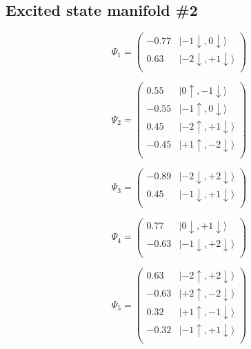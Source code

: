 \documentclass{article}
\begin{document}
\subsection{Excited state manifold \#2}


\begin{equation}
\Psi_{1} = 
\begin{pmatrix}
-      0.77  &  |-1\downarrow , 0\downarrow\rangle  \\
      0.63  &  |-2\downarrow , +1\downarrow\rangle  \\
\end{pmatrix}
\end{equation}

\begin{equation}
\Psi_{2} = 
\begin{pmatrix}
      0.55  &  |0\uparrow , -1\downarrow\rangle  \\
-      0.55  &  |-1\uparrow , 0\downarrow\rangle  \\
      0.45  &  |-2\uparrow , +1\downarrow\rangle  \\
-      0.45  &  |+1\uparrow , -2\downarrow\rangle  \\
\end{pmatrix}
\end{equation}

\begin{equation}
\Psi_{3} = 
\begin{pmatrix}
-      0.89  &  |-2\downarrow , +2\downarrow\rangle  \\
      0.45  &  |-1\downarrow , +1\downarrow\rangle  \\
\end{pmatrix}
\end{equation}

\begin{equation}
\Psi_{4} = 
\begin{pmatrix}
      0.77  &  |0\downarrow , +1\downarrow\rangle  \\
-      0.63  &  |-1\downarrow , +2\downarrow\rangle  \\
\end{pmatrix}
\end{equation}

\begin{equation}
\Psi_{5} = 
\begin{pmatrix}
      0.63  &  |-2\uparrow , +2\downarrow\rangle  \\
-      0.63  &  |+2\uparrow , -2\downarrow\rangle  \\
      0.32  &  |+1\uparrow , -1\downarrow\rangle  \\
-      0.32  &  |-1\uparrow , +1\downarrow\rangle  \\
\end{pmatrix}
\end{equation}
\end{document}
